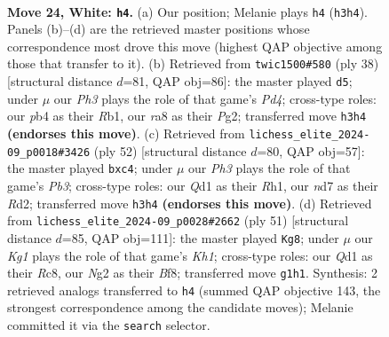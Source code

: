 \documentclass[11pt]{article}
\begin{document}
\clearpage

\begin{figure}[p]\centering
\begin{subfigure}{0.46\textwidth}\centering
\resizebox{\linewidth}{!}{%
\newchessgame
\chessboard[
  setfen={r6r/3nk2p/1ppbp1p1/8/1p1P4/P3P1qP/1P3RN1/R1BQ2K1 w - - 2 24},
  showmover=false,
  pgfstyle=straightmove, color=movearrow, markmove={h3-h4}
]}
\caption{}
\end{subfigure}\hfill
\begin{subfigure}{0.46\textwidth}\centering
\resizebox{\linewidth}{!}{%
\newchessgame
\chessboard[
  setfen={3r2k1/pp3rpp/2p1b3/4Pp2/P2P1P2/2qBQ3/2P3PP/RR5K w - - 1 20},
  showmover=false,
  pgfstyle=straightmove, color=movearrow, markmove={d4-d5}
]}
\caption{}
\end{subfigure}
\\[4pt]
\begin{subfigure}{0.46\textwidth}\centering
\resizebox{\linewidth}{!}{%
\newchessgame
\chessboard[
  setfen={4r1k1/1p4r1/p3b3/8/1qp2p2/nPN4P/PQ1RBPP1/5K1R w - - 0 27},
  showmover=false,
  pgfstyle=straightmove, color=movearrow, markmove={b3-c4}
]}
\caption{}
\end{subfigure}\hfill
\begin{subfigure}{0.46\textwidth}\centering
\resizebox{\linewidth}{!}{%
\newchessgame
\chessboard[
  setfen={2r2b1k/1p2q1p1/p2pNn1r/3P2Qp/P7/3B1R1P/1P4P1/5RK1 b - - 0 26},
  showmover=false,
  pgfstyle=straightmove, color=movearrow, markmove={h8-g8}
]}
\caption{}
\end{subfigure}
\caption{\textbf{Move 24, White: \texttt{h4}.} (a) Our position; Melanie plays \texttt{h4} (\texttt{h3h4}). Panels (b)--(d) are the retrieved master positions whose correspondence most drove this move (highest QAP objective among those that transfer to it). (b) Retrieved from \texttt{twic1500\#580} (ply 38) [structural distance $d$=81, QAP obj=86]: the master played \texttt{d5}; under $\mu$ our \emph{Ph3} plays the role of that game's \emph{Pd4}; cross-type roles: our \emph{p}b4 as their \emph{R}b1, our \emph{r}a8 as their \emph{P}g2; transferred move \texttt{h3h4} \textbf{(endorses this move)}. (c) Retrieved from \texttt{lichess\_elite\_2024-09\_p0018\#3426} (ply 52) [structural distance $d$=80, QAP obj=57]: the master played \texttt{bxc4}; under $\mu$ our \emph{Ph3} plays the role of that game's \emph{Pb3}; cross-type roles: our \emph{Q}d1 as their \emph{R}h1, our \emph{n}d7 as their \emph{R}d2; transferred move \texttt{h3h4} \textbf{(endorses this move)}. (d) Retrieved from \texttt{lichess\_elite\_2024-09\_p0028\#2662} (ply 51) [structural distance $d$=85, QAP obj=111]: the master played \texttt{Kg8}; under $\mu$ our \emph{Kg1} plays the role of that game's \emph{Kh1}; cross-type roles: our \emph{Q}d1 as their \emph{R}c8, our \emph{N}g2 as their \emph{B}f8; transferred move \texttt{g1h1}. Synthesis: 2 retrieved analogs transferred to \texttt{h4} (summed QAP objective 143, the strongest correspondence among the candidate moves); Melanie committed it via the \texttt{search} selector.}
\label{fig:thought-m46}
\end{figure}
\end{document}
